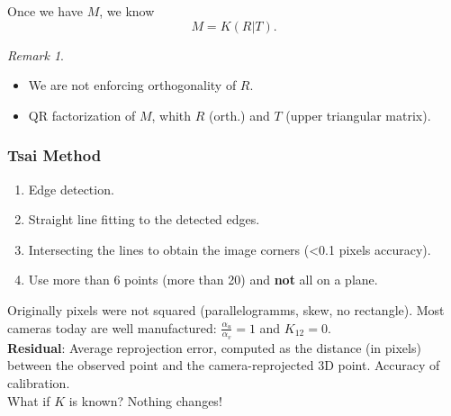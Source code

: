 \documentclass[a4paper,12 pt]{article}
\theoremstyle{definition}
\theoremstyle{remark}
\newtheorem*{bmk}{Remark}
\theoremstyle{definition}
\theoremstyle{definition}
\theoremstyle{definition}
\theoremstyle{remark}
\theoremstyle{definition}
\begin{document}
Once we have $M$, we know
\begin{equation}
M=K(R|T).
\end{equation}
\begin{bmk}
\
\begin{itemize}
\item We are not enforcing orthogonality of $R$.
\item QR factorization of $M$, whith $R$ (orth.) and $T$ (upper triangular matrix). 
\end{itemize}
\end{bmk}
\subsubsection*{Tsai Method}
\begin{enumerate} [1.]
\item Edge detection.
\item Straight line fitting to the detected edges.
\item Intersecting the lines to obtain the image corners (<0.1 pixels accuracy).
\item Use more than 6 points (more than 20) and \textbf{not} all on a plane.
\end{enumerate}
Originally pixels were not squared (parallelogramms, skew, no rectangle). Most cameras today are well manufactured: $\frac{\alpha_u}{\alpha_v}=1$ and $K_{12}=0$.\\
\textbf{Residual}: Average reprojection error, computed as the distance (in pixels) between the observed point and the camera-reprojected 3D point. Accuracy of calibration.\\
What if $K$ is known? Nothing changes!
\end{document}
